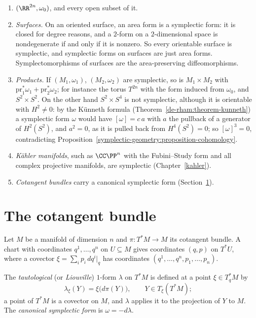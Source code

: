 \begin{example}\label{symplectic-geometry:example-manifolds}
\begin{enumerate}
\item $(\RR^{2n}, \omega_0)$, and every open subset of it.
\item \emph{Surfaces.} On an oriented surface, an area form is a symplectic form: it is closed for degree reasons, and a $2$-form on a $2$-dimensional space is nondegenerate if and only if it is nonzero.
So every orientable surface is symplectic, and symplectic forms on surfaces are just area forms. Symplectomorphisms of surfaces are the area-preserving diffeomorphisms.
\item \emph{Products.} If $(M_1, \omega_1)$, $(M_2, \omega_2)$ are symplectic, so is $M_1 \times M_2$ with $\mathrm{pr}_1^*\omega_1 + \mathrm{pr}_2^*\omega_2$; for instance the torus $T^{2n}$ with the form
induced from $\omega_0$, and $S^2 \times S^2$. On the other hand $S^2 \times S^4$ is not symplectic, although it is orientable with $H^2 \neq 0$: by the K\"unneth formula
(Theorem~\ref{de-rham:theorem-kunneth}) a symplectic form $\omega$ would have $[\omega] = c\,a$ with $a$ the pullback of a generator of $H^2(S^2)$, and $a^2 = 0$, as it is pulled back from
$H^4(S^2) = 0$; so $[\omega]^3 = 0$, contradicting Proposition~\ref{symplectic-geometry:proposition-cohomology}.
\item \emph{K\"ahler manifolds}, such as $\CC\PP^n$ with the Fubini--Study form and all complex projective manifolds, are symplectic (Chapter~\ref{kahler}).
\item \emph{Cotangent bundles} carry a canonical symplectic form (Section~\ref{symplectic-geometry:section-cotangent}).
\end{enumerate}
\end{example}

\section{The cotangent bundle}\label{symplectic-geometry:section-cotangent}

Let $M$ be a manifold of dimension $n$ and $\pi \colon T^*M \to M$ its cotangent bundle. A chart with coordinates $q^1, \ldots, q^n$ on $U \subseteq M$ gives coordinates $(q, p)$ on $T^*U$, where a covector
$\xi = \sum_ip_i\,dq^i|_q$ has coordinates $(q^1, \ldots, q^n, p_1, \ldots, p_n)$.

\begin{definition}\label{symplectic-geometry:definition-tautological}
The \emph{tautological} (or \emph{Liouville}) $1$-form $\lambda$ on $T^*M$ is defined at a point $\xi \in T^*_qM$ by
\[
\lambda_\xi(Y) = \xi\bigl(d\pi(Y)\bigr), \qquad Y \in T_\xi(T^*M);
\]
a point of $T^*M$ is a covector on $M$, and $\lambda$ applies it to the projection of $Y$ to $M$. The \emph{canonical symplectic form} is $\omega = -d\lambda$.
\end{definition}

